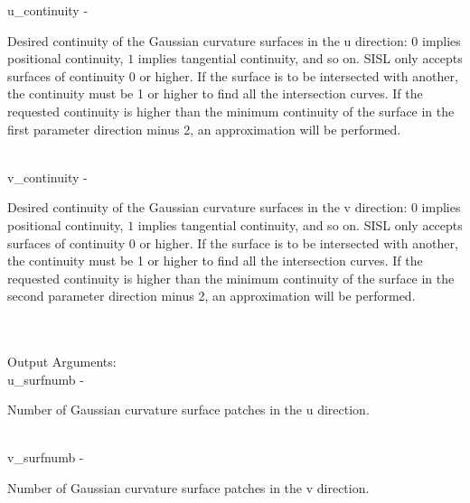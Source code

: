         \>\>    {\fov u\_continuity}\> - \>  \begin{minipg2}
                     Desired continuity of the Gaussian curvature surfaces
                          in the u direction: $0$ implies positional continuity,
                          $1$ implies tangential continuity, and so on.
                          SISL only accepts surfaces of continuity 0 or higher.
                          If the surface is to be intersected with another,
                          the continuity must be 1 or higher to find all the
                          intersection curves. If the requested continuity is higher than
                          the minimum continuity of the surface in the first parameter
                          direction minus 2, an approximation will be performed.
                               \end{minipg2}\\[0.8ex]
        \>\>    {\fov v\_continuity}\> - \>  \begin{minipg2}
                     Desired continuity of the Gaussian curvature surfaces
                          in the v direction: $0$ implies positional continuity,
                          $1$ implies tangential continuity, and so on.
                          SISL only accepts surfaces of continuity 0 or higher.
                          If the surface is to be intersected with another,
                          the continuity must be 1 or higher to find all the
                          intersection curves. If the requested continuity is higher than
                          the minimum continuity of the surface in the second parameter
                          direction minus 2, an approximation will be performed.
                               \end{minipg2}\\[0.8ex]
\\
	\>Output Arguments:\\
        \>\>    {\fov u\_surfnumb}\> - \>  \begin{minipg2}
                     Number of Gaussian curvature surface patches
                          in the u direction.
                               \end{minipg2}\\[0.8ex]
        \>\>    {\fov v\_surfnumb}\> - \>  \begin{minipg2}
                     Number of Gaussian curvature surface patches
                          in the v direction.
                               \end{minipg2}\\[0.8ex]
